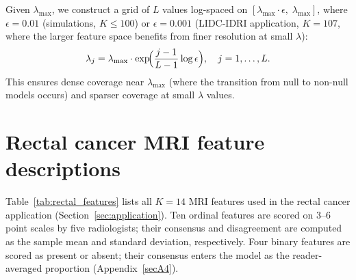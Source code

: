 \documentclass[referee,lineno,pdflatex,sn-vancouver-num]{sn-jnl}
\begin{document}
\begin{appendices}
Given $\lambda_{\max}$, we construct a grid of $L$ values log-spaced on $[\lambda_{\max} \cdot \epsilon,\; \lambda_{\max}]$, where $\epsilon = 0.01$ (simulations, $K \leq 100$) or $\epsilon = 0.001$ (LIDC-IDRI application, $K = 107$, where the larger feature space benefits from finer resolution at small $\lambda$):
\[
  \lambda_j = \lambda_{\max} \cdot \exp\!\Bigl(\frac{j-1}{L-1} \log \epsilon\Bigr), \quad j = 1,\dots,L.
\]
This ensures dense coverage near $\lambda_{\max}$ (where the transition from null to non-null models occurs) and sparser coverage at small $\lambda$ values.


\section{Rectal cancer MRI feature descriptions}\label{app:rectal_features}

Table~\ref{tab:rectal_features} lists all $K = 14$ MRI features used in the rectal cancer application (Section~\ref{sec:application}).
Ten ordinal features are scored on 3--6 point scales by five radiologists; their consensus and disagreement are computed as the sample mean and standard deviation, respectively.
Four binary features are scored as present or absent; their consensus enters the model as the reader-averaged proportion (Appendix~\ref{secA4}).


\end{appendices}
\end{document}
